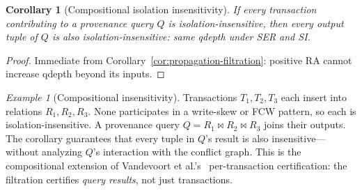 \documentclass[acmsmall,review,anonymous]{acmart}
\newtheorem{corollary}{Corollary}
\theoremstyle{remark}
\newtheorem{example}{Example}
\numberwithin{definition}{section}
\numberwithin{theorem}{section}
\numberwithin{lemma}{section}
\numberwithin{corollary}{section}
\numberwithin{remark}{section}
\numberwithin{example}{section}
\numberwithin{observation}{section}
\numberwithin{assumption}{section}
\begin{document}
\begin{corollary}[Compositional isolation insensitivity]
  \label{cor:isolation-migration}
  If every transaction contributing to a provenance query $Q$ is
  isolation-insensitive, then every output tuple of $Q$ is also
  isolation-insensitive: same qdepth under SER and SI.
\end{corollary}
\begin{proof}
  Immediate from Corollary~\ref{cor:propagation-filtration}: positive
  RA cannot increase qdepth beyond its inputs.
\end{proof}

\begin{example}[Compositional insensitivity]
  \label{ex:complement-union}
  Transactions $T_1, T_2, T_3$ each insert into relations
  $R_1, R_2, R_3$.
  None participates in a write-skew or FCW pattern, so each is
  isolation-insensitive.
  A provenance query $Q = R_1 \bowtie R_2 \bowtie R_3$ joins their
  outputs.
  The corollary guarantees that every tuple in $Q$'s result is also
  insensitive---without analyzing $Q$'s interaction with the conflict
  graph.
  This is the compositional extension of Vandevoort et
  al.'s~\cite{vandevoort2025mixed} per-transaction certification:
  the filtration certifies \emph{query results}, not just transactions.
\end{example}
\end{document}
